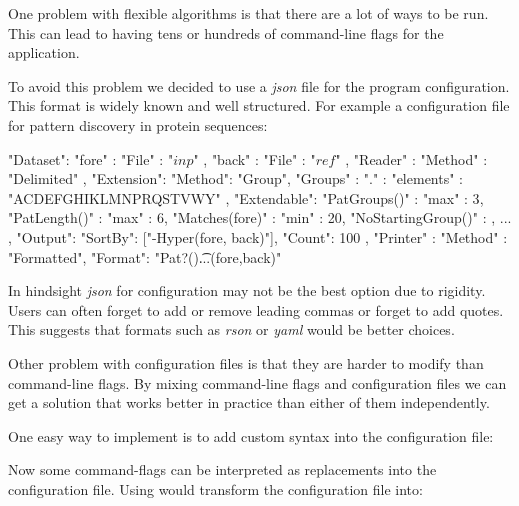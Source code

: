 One problem with flexible algorithms is that there are a lot of ways to be run. This can lead to having tens or hundreds of command-line flags for the application.

To avoid this problem we decided to use a \emph{json} file for the program configuration. This format is widely known and well structured. For example a configuration file for pattern discovery in protein sequences:

\begin{file}
{
    "Dataset": {
        "fore" : { "File" : "$inp$" },
        "back" : { "File" : "$ref$" }
    },
    "Reader" : {
        "Method" : "Delimited"
    },
    "Extension": {
        "Method": "Group",
        "Groups" : {
            "." : { "elements" : "ACDEFGHIKLMNPRQSTVWY"}
        },
        "Extendable": {
            "PatGroups()" : {"max" : 3},
            "PatLength()" : {"max" : 6},
            "Matches(fore)" : {"min" : 20},
            "NoStartingGroup()" : {}
        },
        ...
    },
    "Output": {
        "SortBy": ["-Hyper(fore, back)"],
        "Count": 100
    },
    "Printer" : {
        "Method" : "Formatted",
        "Format": "Pat?()\t...\tHyper(fore,back)\n"
    }
}
\end{file}

In hindsight \emph{json} for configuration may not be the best option due to rigidity. Users can often forget to add or remove leading commas or forget to add quotes. This suggests that formats such as \emph{rson} or \emph{yaml} would be better choices.

Other problem with configuration files is that they are harder to modify than command-line flags. By mixing command-line flags and configuration files we can get a solution that works better in practice than either of them independently.

One easy way to implement is to add custom syntax into the configuration file:

\begin{file}
"Datasets" : {
    "fore" : { "File" : "$argument:default$"
    ...
\end{file}

Now some command-flags can be interpreted as replacements into the configuration file. Using  would transform the configuration file into:

\begin{file}
"Datasets" : {
    "fore" : { "File" : "other"
    ...
\end{file}

